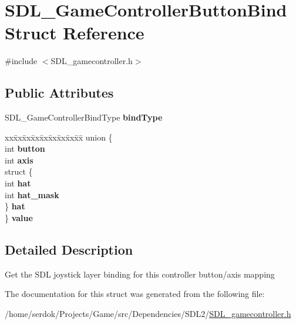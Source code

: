 \hypertarget{structSDL__GameControllerButtonBind}{}\section{S\+D\+L\+\_\+\+Game\+Controller\+Button\+Bind Struct Reference}
\label{structSDL__GameControllerButtonBind}


{\ttfamily \#include $<$S\+D\+L\+\_\+gamecontroller.\+h$>$}

\subsection*{Public Attributes}
\begin{DoxyCompactItemize}
\item 
\mbox{\label{structSDL__GameControllerButtonBind_a032fd941b0e8e5e2cdf52b7597f559b9}} 
S\+D\+L\+\_\+\+Game\+Controller\+Bind\+Type {\bfseries bind\+Type}
\item 
\mbox{\label{structSDL__GameControllerButtonBind_a617787596bd34e89e7619a585cab0c94}} 
\begin{tabbing}
xx\=xx\=xx\=xx\=xx\=xx\=xx\=xx\=xx\=\kill
union \{\\
\>int {\bfseries button}\\
\>int {\bfseries axis}\\
\>struct \{\\
\>\>int {\bfseries hat}\\
\>\>int {\bfseries hat\_mask}\\
\>\} {\bfseries hat}\\
\} {\bfseries value}\\

\end{tabbing}\end{DoxyCompactItemize}


\subsection{Detailed Description}
Get the S\+DL joystick layer binding for this controller button/axis mapping 

The documentation for this struct was generated from the following file\+:\begin{DoxyCompactItemize}
\item 
/home/serdok/\+Projects/\+Game/src/\+Dependencies/\+S\+D\+L2/\hyperlink{SDL__gamecontroller_8h}{S\+D\+L\+\_\+gamecontroller.\+h}\end{DoxyCompactItemize}
